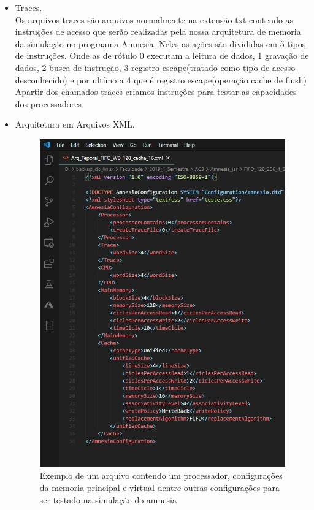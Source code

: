 \documentclass[conference]{IEEEtran}
\begin{document}
\begin{itemize}
\item Traces. \\

Os arquivos traces são  arquivos normalmente na extensão txt contendo as instruções de acesso que serão realizadas pela nossa arquitetura de memoria da simulação no prograama Amnesia. Neles as ações são divididas em 5 tipos de instruções. Onde as de rótulo 0 executam a leitura de dados, 1 gravação de dados, 2 busca de instrução, 3 registro escape(tratado como tipo de acesso desconhecido) e por ultímo a 4 que é registro escape(operação cache de flush)
Apartir dos chamados traces criamos instruções para testar as capacidades dos processadores.\\

\item Arquitetura em Arquivos XML. 

\begin{figure}[H]
  \includegraphics[width=\linewidth]{arquitetura_de_memoria.jpg}
  \caption{Exemplo de um arquivo contendo um processador, configurações da memoria principal e virtual dentre outras configurações para ser testado na simulação do amnesia}
  \label{fig:Tela do Programa Amnesia fazendo um teste}
\end{figure}


\end{itemize}
\end{document}
